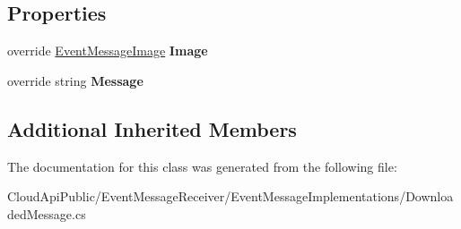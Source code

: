 \subsection*{Properties}
\begin{DoxyCompactItemize}
\item 
\hypertarget{class_cloud_api_public_1_1_event_message_receiver_1_1_downloaded_message_a6ab2a289a72fadfb0b333212fc02e009}{override \hyperlink{namespace_cloud_api_public_1_1_static_aefcc1e7e1c81366ec3f6affd41c1f817}{Event\-Message\-Image} {\bfseries Image}}\label{class_cloud_api_public_1_1_event_message_receiver_1_1_downloaded_message_a6ab2a289a72fadfb0b333212fc02e009}

\item 
\hypertarget{class_cloud_api_public_1_1_event_message_receiver_1_1_downloaded_message_a8b599e5d3794bfb7629357b05e418e2d}{override string {\bfseries Message}}\label{class_cloud_api_public_1_1_event_message_receiver_1_1_downloaded_message_a8b599e5d3794bfb7629357b05e418e2d}

\end{DoxyCompactItemize}
\subsection*{Additional Inherited Members}


The documentation for this class was generated from the following file\-:\begin{DoxyCompactItemize}
\item 
Cloud\-Api\-Public/\-Event\-Message\-Receiver/\-Event\-Message\-Implementations/Downloaded\-Message.\-cs\end{DoxyCompactItemize}
